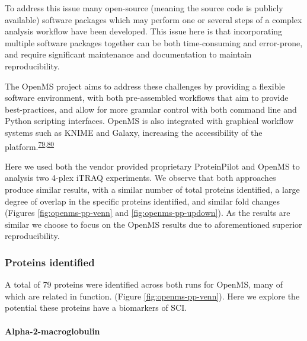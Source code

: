 \documentclass[
]{article}
\begin{document}
To address this issue many open-source (meaning the source code is publicly available) software packages which may perform one or several steps of a complex analysis workflow have been developed.
This issue here is that incorporating multiple software packages together can be both time-consuming and error-prone, and require significant maintenance and documentation to maintain reproducibility.

The OpenMS project aims to address these challenges by providing a flexible software environment, with both pre-assembled workflows that aim to provide best-practices, and allow for more granular control with both command line and Python scripting interfaces.
OpenMS is also integrated with graphical workflow systems such as KNIME and Galaxy, increasing the accessibility of the platform.\textsuperscript{\protect\hyperlink{ref-berthold_knime_2009}{79},\protect\hyperlink{ref-goecks_galaxy_2010}{80}}

Here we used both the vendor provided proprietary ProteinPilot and OpenMS to analysis two 4-plex iTRAQ experiments.
We observe that both approaches produce similar results, with a similar number of total proteins identified, a large degree of overlap in the specific proteins identified, and similar fold changes (Figures \ref{fig:openms-pp-venn} and \ref{fig:openms-pp-updown}).
As the results are similar we choose to focus on the OpenMS results due to aforementioned superior reproducibility.

\hypertarget{proteins-identified}{%
\subsubsection{Proteins identified}\label{proteins-identified}}

A total of 79 proteins were identified across both runs for OpenMS, many of which are related in function. (Figure \ref{fig:openms-pp-venn}).
Here we explore the potential these proteins have a biomarkers of SCI.

\hypertarget{alpha-2-macroglobulin}{%
\paragraph{Alpha-2-macroglobulin}\label{alpha-2-macroglobulin}}
\end{document}
